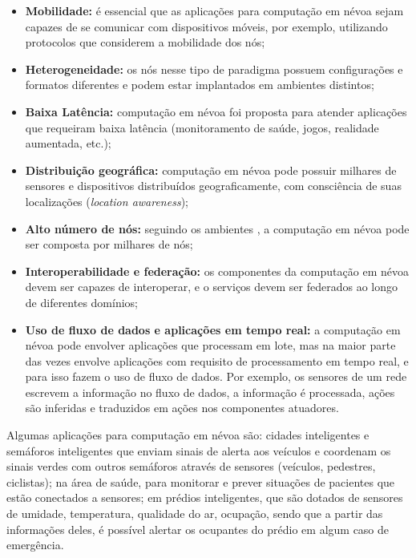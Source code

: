 \begin{itemize}

    \item \textbf{Mobilidade:} é essencial que as aplicações para computação em névoa sejam
    capazes de se comunicar com dispositivos móveis, por exemplo, utilizando
    protocolos que considerem a mobilidade dos nós;

    \item \textbf{Heterogeneidade:} os nós nesse tipo de paradigma possuem
    configurações e formatos diferentes e podem estar implantados em ambientes
    distintos;

    \item \textbf{Baixa Latência:} computação em névoa foi proposta para
    atender aplicações que requeiram baixa latência (monitoramento de saúde,
    jogos, realidade aumentada, etc.);

    \item \textbf{Distribuição geográfica:} computação em névoa pode possuir
    milhares de sensores e dispositivos distribuídos geograficamente, com
    consciência de suas localizações (\emph{location awareness});

    \item \textbf{Alto número de nós:} seguindo os ambientes \iot, a computação
    em névoa pode ser composta por milhares de nós;

    \item \textbf{Interoperabilidade e federação:} os componentes da computação
    em névoa devem ser capazes de interoperar, e o serviços devem ser federados
    ao longo de diferentes domínios;

    \item \textbf{Uso de fluxo de dados e aplicações em tempo real:} a
    computação em névoa pode envolver aplicações que processam em lote, mas na
    maior parte das vezes envolve aplicações com requisito de processamento em
    tempo real, e para isso fazem o uso de fluxo de dados. Por exemplo, os
    sensores de um rede \iot escrevem a informação no fluxo de dados, a
    informação é processada, ações são inferidas e traduzidos em
    ações nos componentes atuadores.

\end{itemize}

Algumas aplicações para computação em névoa são:
cidades inteligentes e
semáforos inteligentes que enviam sinais de alerta aos veículos e coordenam os
sinais verdes com outros semáforos através de sensores (veículos, pedestres,
ciclistas);
na área de saúde, para monitorar e prever situações de pacientes que
estão conectados a sensores;
em prédios inteligentes, que são dotados de sensores
de umidade, temperatura, qualidade do ar, ocupação, sendo que a partir das
informações deles, é possível alertar os ocupantes do prédio em algum caso de
emergência.

